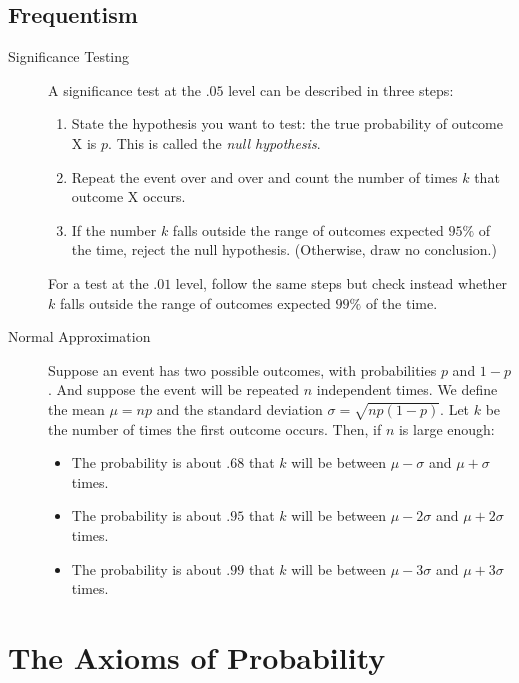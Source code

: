 \documentclass[justified]{tufte-book}
\providecommand{\tightlist}{%
  \setlength{\itemsep}{0pt}\setlength{\parskip}{0pt}}
\theoremstyle{definition}
\theoremstyle{definition}
\theoremstyle{definition}
\theoremstyle{remark}
\begin{document}
\hypertarget{frequentism-1}{%
\section*{Frequentism}\label{frequentism-1}}

\begin{description}
\item[Significance Testing]
A significance test at the \(.05\) level can be described in three
steps:

\begin{enumerate}
\def\labelenumi{\arabic{enumi}.}
\tightlist
\item
  State the hypothesis you want to test: the true probability of outcome
  X is \(p\). This is called the \emph{null hypothesis}.
\item
  Repeat the event over and over and count the number of times \(k\)
  that outcome X occurs.
\item
  If the number \(k\) falls outside the range of outcomes expected
  \(95\%\) of the time, reject the null hypothesis. (Otherwise, draw no
  conclusion.)
\end{enumerate}

For a test at the \(.01\) level, follow the same steps but check instead
whether \(k\) falls outside the range of outcomes expected \(99\%\) of
the time.
\item[Normal Approximation]
Suppose an event has two possible outcomes, with probabilities \(p\) and
\(1-p\). And suppose the event will be repeated \(n\) independent times.
We define the mean \(\mu = np\) and the standard deviation
\(\sigma = \sqrt{np(1-p)}\). Let \(k\) be the number of times the first
outcome occurs. Then, if \(n\) is large enough:

\begin{itemize}
\tightlist
\item
  The probability is about \(.68\) that \(k\) will be between
  \(\mu - \sigma\) and \(\mu + \sigma\) times.
\item
  The probability is about \(.95\) that \(k\) will be between
  \(\mu - 2\sigma\) and \(\mu + 2\sigma\) times.
\item
  The probability is about \(.99\) that \(k\) will be between
  \(\mu - 3\sigma\) and \(\mu + 3\sigma\) times.
\end{itemize}
\end{description}

\hypertarget{the-axioms-of-probability}{%
\chapter{The Axioms of Probability}\label{the-axioms-of-probability}}
\end{document}
